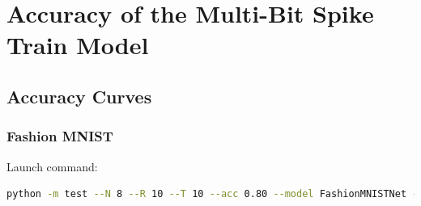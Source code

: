 \chapter{Accuracy of the Multi-Bit Spike Train Model}
\label{appendix:accuracy}

\section{Accuracy Curves}
\label{appendix:accuracy_curves}

    \subsection{Fashion MNIST}
    \label{appendix:accuracy_curves_fashion_mnist}
        Launch command: 
        \begin{lstlisting}[language=Bash, basicstyle=\small, breaklines=true]
python -m test --N 8 --R 10 --T 10 --acc 0.80 --model FashionMNISTNet --data-path /scratch/zyi/codeSpace/data --dataset FashionMNIST --batch-size 128 --opt adam --lr 2e-3 --lr-scheduler none --epochs 5 --lr-warmup-epochs 0 --output-dir /scratch/zyi/codeSpace/MultibitSpikes --mixup-alpha 0.0 --cutmix-alpha 0.0 --label-smoothing 0.0 --disable-amp
        \end{lstlisting}

